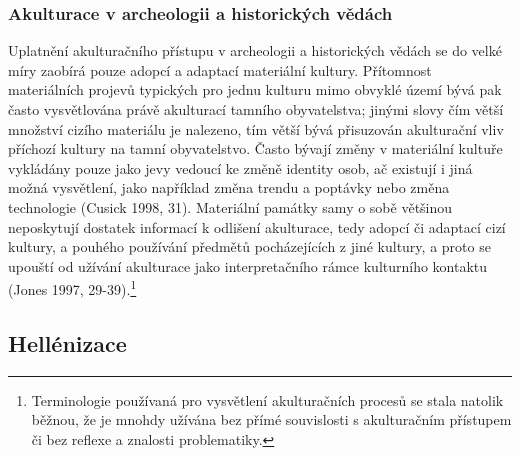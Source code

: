 \subsubsection[akulturace-v-archeologii-a-historických-vědách]{Akulturace v archeologii a historických vědách}

Uplatnění akulturačního přístupu v archeologii a historických vědách se do velké míry zaobírá pouze adopcí a adaptací materiální kultury. Přítomnost materiálních projevů typických pro jednu kulturu mimo obvyklé území bývá pak často vysvětlována právě akulturací tamního obyvatelstva; jinými slovy čím větší množství cizího materiálu je nalezeno, tím větší bývá přisuzován akulturační vliv příchozí kultury na tamní obyvatelstvo. Často bývají změny v materiální kultuře vykládány pouze jako jevy vedoucí ke změně identity osob, ač existují i jiná možná vysvětlení, jako například změna trendu a poptávky nebo změna technologie (Cusick 1998, 31). Materiální památky samy o sobě většinou neposkytují dostatek informací k odlišení akulturace, tedy adopcí či adaptací cizí kultury, a pouhého používání předmětů pocházejících z jiné kultury, a proto se upouští od užívání akulturace jako interpretačního rámce kulturního kontaktu (Jones 1997, 29-39).\footnote{Terminologie používaná pro vysvětlení akulturačních procesů se stala natolik běžnou, že je mnohdy užívána bez přímé souvislosti s akulturačním přístupem či bez reflexe a znalosti problematiky.}

\subsection[hellénizace]{Hellénizace}

